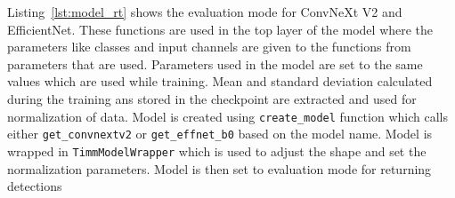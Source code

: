 Listing~\ref{lst:model_rt} shows the evaluation mode for ConvNeXt V2 and EfficientNet. These functions are used in the top layer of the model where the parameters like classes and input channels are given to the functions from parameters that are used. Parameters used in the model are set to the same values which are used while training. Mean and standard deviation calculated during the training ans stored in the checkpoint are extracted and used for normalization of data. Model is created using \texttt{create\_model} function which calls either \texttt{get\_convnextv2} or \texttt{get\_effnet\_b0} based on the model name. Model is wrapped in \texttt{TimmModelWrapper} which is used to adjust the shape and set the normalization parameters. Model is then set to evaluation mode for returning detections
